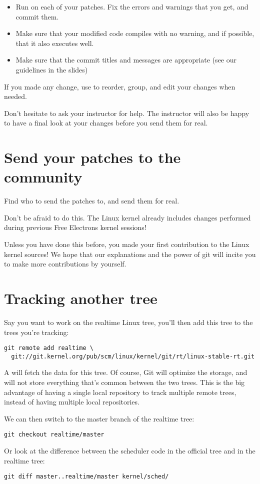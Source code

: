 \begin{itemize}
\item Run  on each of your patches.
      Fix the errors and warnings that you get, and commit them.
\item Make sure that your modified code compiles with no warning,
      and if possible, that it also executes well.
\item Make sure that the commit titles and messages are appropriate
      (see our guidelines in the slides)
\end{itemize}

If you made any change, use  to
reorder, group, and edit your changes when needed. 

Don't hesitate to ask your instructor for help. The instructor will also 
be happy to have a final look at your changes before you send them for real.

\section{Send your patches to the community}

Find who to send the patches to, and send them for real.

Don't be afraid to do this. The Linux kernel already includes changes
performed during previous Free Electrons kernel sessions!

Unless you have done this before, you made your first contribution 
to the Linux kernel sources! We hope that our explanations and the power 
of git will incite you to make more contributions by yourself.

\section{Tracking another tree}

Say you want to work on the realtime Linux tree, you'll then add this
tree to the trees you're tracking:

\small
\begin{verbatim}
git remote add realtime \
  git://git.kernel.org/pub/scm/linux/kernel/git/rt/linux-stable-rt.git
\end{verbatim}
\normalsize

A  will fetch the data for this tree. Of course, Git
will optimize the storage, and will not store everything that's common
between the two trees. This is the big advantage of having a single
local repository to track multiple remote trees, instead of having
multiple local repositories.

We can then switch to the master branch of the realtime tree:

\begin{verbatim}
git checkout realtime/master
\end{verbatim}

Or look at the difference between the scheduler code in the official
tree and in the realtime tree:

\begin{verbatim}
git diff master..realtime/master kernel/sched/
\end{verbatim}

